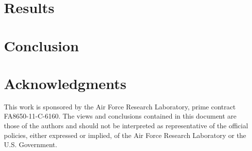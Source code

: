 \documentclass[]{article}
\begin{document}
\section{Results}
\label{sec:Results}



\section{Conclusion}



 \section*{Acknowledgments}
This work is sponsored by the Air Force Research Laboratory, prime contract FA8650-11-C-6160.  The views and conclusions contained in this document are those of the authors and should not be interpreted as representative of the official policies, either expressed or implied, of the Air Force Research Laboratory or the U.S. Government.



\end{document}
